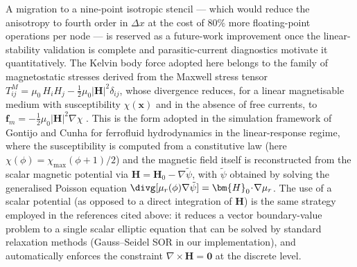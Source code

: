 A migration to a nine-point isotropic stencil --- which would reduce the anisotropy to fourth order in $\Delta x$ at the cost of $80\%$ more floating-point operations per node --- is reserved as a future-work improvement once the linear-stability validation is complete and parasitic-current diagnostics motivate it quantitatively.
The Kelvin body force adopted here belongs to the family of magnetostatic stresses derived from the Maxwell stress tensor $T_{ij}^{M} = \mu_0\,H_i H_j - \tfrac{1}{2}\mu_0|\bm{H}|^{2}\delta_{ij}$, whose divergence reduces, for a linear magnetisable medium with susceptibility $\chi(\bm{x})$ and in the absence of free currents, to $\bm{f}_m = -\tfrac{1}{2}\mu_0|\bm{H}|^{2}\nabla\chi$ \cite{rosensweig1985ferrohydrodynamics}.
This is the form adopted in the simulation framework of Gontijo and Cunha \cite{gontijo_cunha_review} for ferrofluid hydrodynamics in the linear-response regime, where the susceptibility is computed from a constitutive law (here $\chi(\phi) = \chi_{\max}(\phi+1)/2$) and the magnetic field itself is reconstructed from the scalar magnetic potential via $\bm{H} = \bm{H}_0 - \nabla\tilde{\psi}$, with $\tilde{\psi}$ obtained by solving the generalised Poisson equation $\divg[\mu_r(\phi)\nabla\tilde{\psi}] = \bm{H}_0\!\cdot\!\nabla\mu_r$.
The use of a scalar potential (as opposed to a direct integration of $\bm{H}$) is the same strategy employed in the references cited above: it reduces a vector boundary-value problem to a single scalar elliptic equation that can be solved by standard relaxation methods (Gauss--Seidel SOR in our implementation), and automatically enforces the constraint $\nabla\times\bm{H} = \bm{0}$ at the discrete level.

